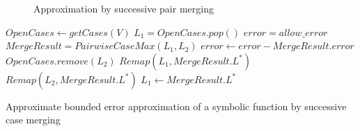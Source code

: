 \begin{figure}[!h]
\centering
\begin{minipage}{.3\textwidth}
  \centering
\end{minipage}
\begin{minipage}{.3\textwidth}
\centering
{}
\end{minipage}
\begin{minipage}{.3\textwidth}
\centering
{}
\end{minipage}
\caption{ Approximation by successive pair merging}
 \label{steplining}
\end{figure}

\begin{algorithm}[!h]
\dontprintsemicolon
{}
$OpenCases \gets getCases(V)$\;
 {
	$L_1 = OpenCases.pop()$\;
	$error = allow\_error$\;
	  { 
		$MergeResult = PairwiseCaseMax( L_1, L_2)$\;
		{
			$error \gets error - MergeResult.error$\;
			$OpenCases.remove(L_2)$\;
			$ Remap(L_1, MergeResult.L^*) $\;
			$ Remap(L_2, MergeResult.L^*) $\;
			$ L_1 \gets MergeResult.L^* $\;
		}
	}
}
\;
\caption{{\sc Approximate} bounded error approximation of a symbolic function by successive case merging}
\label{alg:approx}
\end{algorithm}

